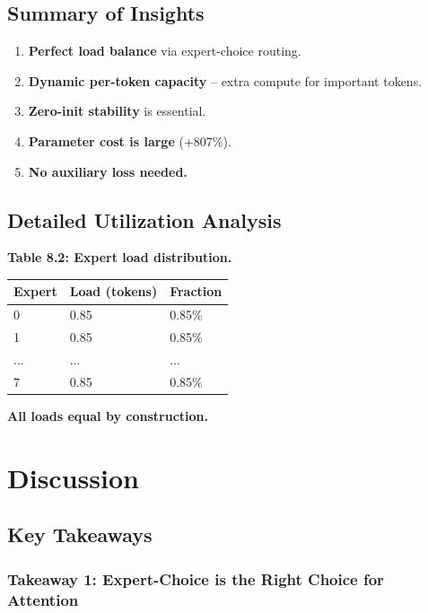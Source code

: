 \subsection{Summary of Insights}

\begin{enumerate}
\item \textbf{Perfect load balance} via expert-choice routing.
\item \textbf{Dynamic per-token capacity} -- extra compute for important tokens.
\item \textbf{Zero-init stability} is essential.
\item \textbf{Parameter cost is large} (+807\%).
\item \textbf{No auxiliary loss needed.}

\end{enumerate}
\subsection{Detailed Utilization Analysis}

\textbf{Table 8.2: Expert load distribution.}

\begin{table}[H]
\centering
\small
\begin{tabular}{lll}
\toprule
\textbf{Expert} & \textbf{Load (tokens)} & \textbf{Fraction} \\
\midrule
0 & 0.85 & 0.85\% \\
1 & 0.85 & 0.85\% \\
... & ... & ... \\
7 & 0.85 & 0.85\% \\
\bottomrule
\end{tabular}
\end{table}

\textbf{All loads equal by construction.}



\section{Discussion}

\subsection{Key Takeaways}

\subsubsection{Takeaway 1: Expert-Choice is the Right Choice for Attention}


